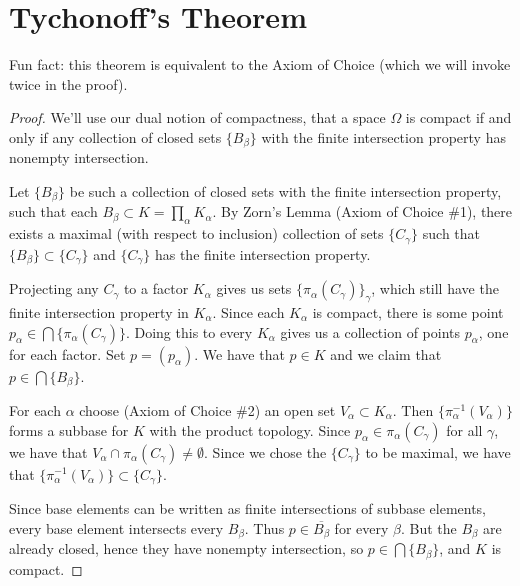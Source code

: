 
\section*{Tychonoff's Theorem}


Fun fact: this theorem is equivalent to the Axiom of Choice (which we will invoke twice in the proof).

\begin{proof}
	
	We'll use our dual notion of compactness, that a space $\Omega$ is compact if and only if any collection of closed sets $\{B_\beta\}$ with the finite intersection property has nonempty intersection.
	
	Let $\{B_\beta\}$ be such a collection of closed sets with the finite intersection property, such that each $B_\beta \subset K = \prod\limits_\alpha K_\alpha$.  By Zorn's Lemma (Axiom of Choice \#1), there exists a maximal (with respect to inclusion) collection of sets  $\{C_\gamma\}$ such that $\{B_\beta\}\subset \{C_\gamma\}$ and $\{C_\gamma\}$ has the finite intersection property.
	
	Projecting any $C_\gamma$ to a factor $K_\alpha$ gives us sets $\{\pi_\alpha (C_\gamma)\}_\gamma$, which still have the finite intersection property in $K_\alpha$.  Since each $K_\alpha$ is compact, there is some point $p_\alpha\in \bigcap\{\pi_\alpha ( C_\gamma)\}$.  Doing this to every $K_\alpha$ gives us a collection of points $p_\alpha$, one for each factor.  Set $p=(p_\alpha)$.  We have that $p\in K$ and we claim that $p\in \bigcap\{B_\beta\}$.
	
	For each  $\alpha$ choose (Axiom of Choice \#2) an open set $V_\alpha \subset K_\alpha$.  Then $\{\pi_\alpha^{-1}(V_\alpha)\}$ forms a subbase for $K$ with the product topology.  Since $p_\alpha \in \pi_\alpha(C_\gamma)$ for all $\gamma$, we have that $V_\alpha\cap \pi_\alpha(C_\gamma)\neq \emptyset$.  Since we chose the $\{C_\gamma\}$ to be maximal, we have that $\{\pi_\alpha^{-1}(V_\alpha)\}\subset \{C_\gamma\}$.
	
	Since base elements can be written as finite intersections of subbase elements, every base element intersects every $B_\beta$.  Thus $p\in \overline{B_\beta}$ for every $\beta$.  But the $B_\beta$ are already closed, hence they have nonempty intersection, so $p\in \bigcap\{B_\beta\}$, and $K$ is compact.
	
\end{proof}